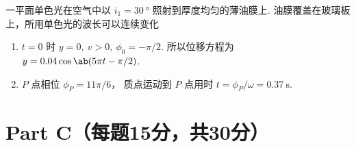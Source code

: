 \begin{problem}
  一平面单色光在空气中以 $i_1 = \qty{30}\degree$ 照射到厚度均匀的薄油膜上.
  油膜覆盖在玻璃板上，所用单色光的波长可以连续变化
\end{problem}
\begin{solution}\leavevmode
\begin{enumerate}
  \item $t = 0$ 时 $y = 0,~ v > 0,~ \phi_0 = -\pi/2$.
  所以位移方程为 $y = 0.04\cos\ab(5\pi t - \pi/2)$.
  \item $P$ 点相位 $\phi_P = 11\pi/6$，
  质点运动到 $P$ 点用时 $t = \phi_P/\omega = \qty{0.37}\s$.
\end{enumerate}
\end{solution}

\section{Part C（每题15分，共30分）}


